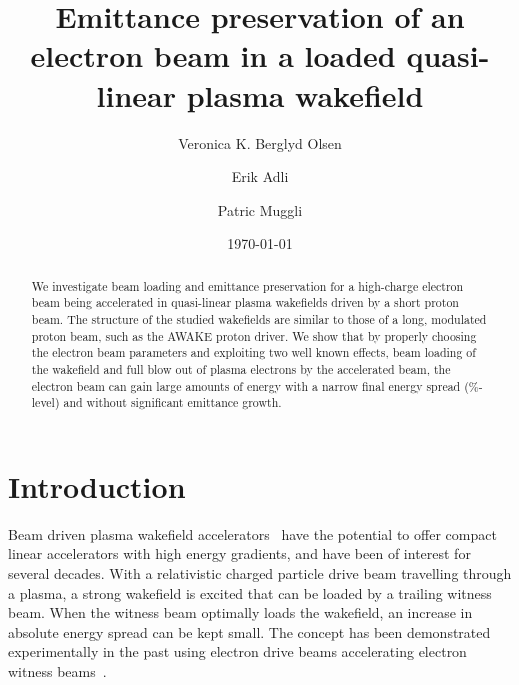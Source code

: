 \documentclass[aps,prstab,reprint,amsmath,amssymb,groupedaddress]{revtex4-1}
\begin{document}

\title{Emittance preservation of an electron beam in a loaded quasi-linear plasma wakefield}

\author{Veronica K. Berglyd Olsen}

\author{Erik Adli}

\author{Patric Muggli}

\date{\today}

\begin{abstract}
We investigate beam loading and emittance preservation for a high-charge electron beam being accelerated in quasi-linear plasma wakefields driven by a short proton beam. The structure of the studied wakefields are similar to those of a long, modulated proton beam, such as the AWAKE proton driver. We show that by properly choosing the electron beam parameters and exploiting two well known effects, beam loading of the wakefield and full blow out of plasma electrons by the accelerated beam, the electron beam can gain large amounts of energy with a narrow final energy spread (\%-level) and without significant emittance growth.
\end{abstract}

\maketitle

\section{Introduction}\label{S:I}

Beam driven plasma wakefield accelerators~\cite{chen:1985} have the potential to offer compact linear accelerators with high energy gradients, and have been of interest for several decades. With a relativistic charged particle drive beam travelling through a plasma, a strong wakefield is excited that can be loaded by a trailing witness beam. When the witness beam optimally loads the wakefield, an increase in absolute energy spread can be kept small. The concept has been demonstrated experimentally in the past using electron drive beams accelerating electron witness beams~\cite{rosenzweig:1988, blumenfeld:2007, kallos:2008, litos:2014}. 
\end{document}
